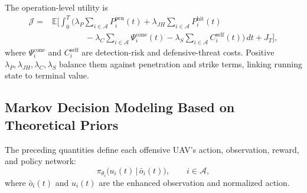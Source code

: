 \documentclass{cja}
\begin{document}
The operation-level utility is
\begin{equation}
\begin{aligned}
\mathcal J
={}&
\mathbb E\Biggl[
\int_0^T
\Biggl(
\lambda_P \sum_{i\in\mathcal{A}} P_i^{\mathrm{pen}}(t)
+
\lambda_{JH} \sum_{i\in\mathcal{A}} P_i^{\mathrm{hit}}(t)\\
&\qquad\qquad
-
\lambda_C \sum_{i\in\mathcal{A}} \Psi_i^{\mathrm{cone}}(t)
-
\lambda_S \sum_{i\in\mathcal{A}} C_i^{\mathrm{self}}(t)
\Biggr)\,dt
+
J_T
\Biggr],
\end{aligned}
\end{equation}
where $\Psi_i^{\mathrm{cone}}$ and $C_i^{\mathrm{self}}$ are detection-risk and defensive-threat costs. Positive $\lambda_P,\lambda_{JH},\lambda_C,\lambda_S$ balance them against penetration and strike terms, linking running state to terminal value.

\subsection{Markov Decision Modeling Based on Theoretical Priors}
\label{subsec:rl-design}

The preceding quantities define each offensive UAV's action, observation, reward, and policy network:
\begin{equation}
\pi_{\theta_i}\bigl(u_i(t)\,\big|\,\bar o_i(t)\bigr),\qquad i\in\mathcal{A},
\end{equation}
where $\bar o_i(t)$ and $u_i(t)$ are the enhanced observation and normalized action.
\end{document}
